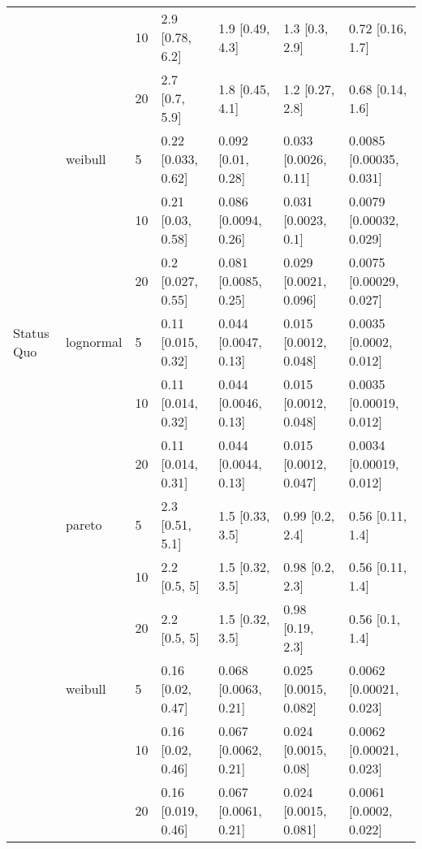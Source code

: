 \begin{tabular}{lllllll}
           &         & 10 &       2.9 [0.78, 6.2] &       1.9 [0.49, 4.3] &          1.3 [0.3, 2.9] &         0.72 [0.16, 1.7] \\
           &         & 20 &        2.7 [0.7, 5.9] &       1.8 [0.45, 4.1] &         1.2 [0.27, 2.8] &         0.68 [0.14, 1.6] \\
           & weibull & 5  &    0.22 [0.033, 0.62] &    0.092 [0.01, 0.28] &    0.033 [0.0026, 0.11] &  0.0085 [0.00035, 0.031] \\
           &         & 10 &     0.21 [0.03, 0.58] &  0.086 [0.0094, 0.26] &     0.031 [0.0023, 0.1] &  0.0079 [0.00032, 0.029] \\
           &         & 20 &     0.2 [0.027, 0.55] &  0.081 [0.0085, 0.25] &   0.029 [0.0021, 0.096] &  0.0075 [0.00029, 0.027] \\
Status Quo & lognormal & 5  &    0.11 [0.015, 0.32] &  0.044 [0.0047, 0.13] &   0.015 [0.0012, 0.048] &   0.0035 [0.0002, 0.012] \\
           &         & 10 &    0.11 [0.014, 0.32] &  0.044 [0.0046, 0.13] &   0.015 [0.0012, 0.048] &  0.0035 [0.00019, 0.012] \\
           &         & 20 &    0.11 [0.014, 0.31] &  0.044 [0.0044, 0.13] &   0.015 [0.0012, 0.047] &  0.0034 [0.00019, 0.012] \\
           & pareto & 5  &       2.3 [0.51, 5.1] &       1.5 [0.33, 3.5] &         0.99 [0.2, 2.4] &         0.56 [0.11, 1.4] \\
           &         & 10 &          2.2 [0.5, 5] &       1.5 [0.32, 3.5] &         0.98 [0.2, 2.3] &         0.56 [0.11, 1.4] \\
           &         & 20 &          2.2 [0.5, 5] &       1.5 [0.32, 3.5] &        0.98 [0.19, 2.3] &          0.56 [0.1, 1.4] \\
           & weibull & 5  &     0.16 [0.02, 0.47] &  0.068 [0.0063, 0.21] &   0.025 [0.0015, 0.082] &  0.0062 [0.00021, 0.023] \\
           &         & 10 &     0.16 [0.02, 0.46] &  0.067 [0.0062, 0.21] &    0.024 [0.0015, 0.08] &  0.0062 [0.00021, 0.023] \\
           &         & 20 &    0.16 [0.019, 0.46] &  0.067 [0.0061, 0.21] &   0.024 [0.0015, 0.081] &   0.0061 [0.0002, 0.022] \\
\bottomrule
\end{tabular}
